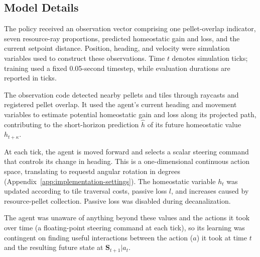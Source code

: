 \documentclass[12pt,fleqn]{article}
\begin{document}
\subsection{Model Details}

The policy received an observation vector comprising one pellet-overlap indicator, seven resource-ray proportions, predicted homeostatic gain and loss, and the current setpoint distance. Position, heading, and velocity were simulation variables used to construct these observations. Time $t$ denotes simulation ticks; training used a fixed 0.05-second timestep, while evaluation durations are reported in ticks.

The observation code detected nearby pellets and tiles through raycasts and registered pellet overlap. It used the agent's current heading and movement variables to estimate potential homeostatic gain and loss along its projected path, contributing to the short-horizon prediction $\hat{h}$ of its future homeostatic value $h_{t+\kappa}$.

At each tick, the agent is moved forward and selects a scalar steering command that controls its change in heading. This is a one-dimensional continuous action space, translating to requestd angular rotation in degrees (Appendix~\ref{app:implementation-settings}). The homeostatic variable $h_t$ was updated according to tile traversal costs, passive loss $l$, and increases caused by resource-pellet collection. Passive loss was disabled during decanalization.

The agent was unaware of anything beyond these values and the actions it took over time (a floating-point steering command at each tick), so its learning was contingent on finding useful interactions between the action (\(a\)) it took at time \(t\) and the resulting future state at \(\mathbf{S}_{t+1}|a_t\).

\end{document}
